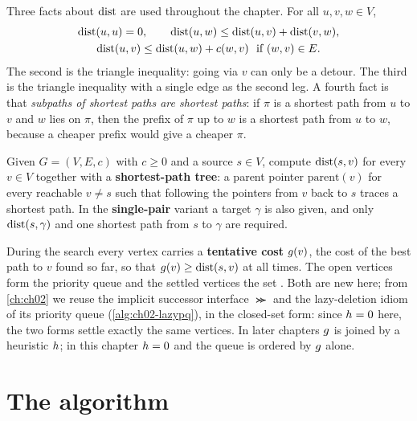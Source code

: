 Three facts about $\operatorname{dist}$ are used throughout the chapter. For all $u,v,w\in V$,
\begin{equation}
\label{eq:ch03-triangle}
\begin{gathered}
\operatorname{dist}(u,u)=0,\qquad
\operatorname{dist}(u,w)\le\operatorname{dist}(u,v)+\operatorname{dist}(v,w),\\
\operatorname{dist}(u,v)\le\operatorname{dist}(u,w)+c(w,v)\ \text{ if }(w,v)\in E .
\end{gathered}
\end{equation}
The second is the triangle inequality: going via $v$ can only be a detour. The third is the
triangle inequality with a single edge as the second leg. A fourth fact is that \emph{subpaths
of shortest paths are shortest paths}: if $\pi$ is a shortest path from $u$ to $v$ and $w$ lies
on $\pi$, then the prefix of $\pi$ up to $w$ is a shortest path from $u$ to $w$, because a
cheaper prefix would give a cheaper $\pi$.

\begin{definition}
\label{def:ch03-sssp}
Given $G=(V,E,c)$ with $c\ge0$ and a source $s\in V$, compute $\operatorname{dist}(s,v)$ for every $v\in V$
together with a \textbf{shortest-path tree}: a parent pointer
$\mathrm{parent}(v)$ for every reachable $v\neq s$ such that following the pointers from $v$
back to $s$ traces a shortest path. In the \textbf{single-pair} variant a target $\gamma$ is also
given, and only $\operatorname{dist}(s,\gamma)$ and one shortest path from $s$ to $\gamma$ are required.
\end{definition}

During the search every vertex carries a \textbf{tentative cost}
$g(v)$, the cost of the best path to $v$ found so far, so that $g(v)\ge\operatorname{dist}(s,v)$ at
all times. The open vertices form the priority queue \Open and the settled vertices the set
\Closed. Both are new here; from \cref{ch:ch02} we reuse the implicit successor interface
$\Succ$ and the lazy-deletion idiom of its priority queue 
(\cref{alg:ch02-lazypq}), in the closed-set form: since $h=0$ here, the two forms settle
exactly the same vertices. In later chapters $g$ is
joined by a heuristic $h$; in this chapter $h=0$ and the queue is ordered by $g$
alone.

\section{The algorithm}
\label{sec:ch03-algorithm}

